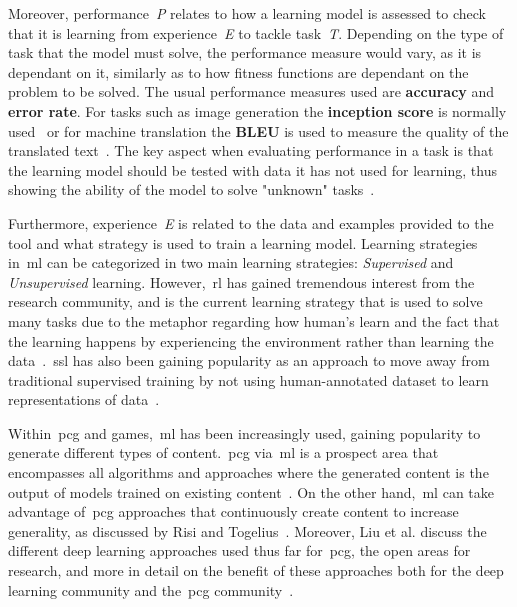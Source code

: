 Moreover, performance~\textit{P} relates to how a learning model is assessed to check that it is learning from experience~\textit{E} to tackle task~\textit{T}. Depending on the type of task that the model must solve, the performance measure would vary, as it is dependant on it, similarly as to how fitness functions are dependant on the problem to be solved. The usual performance measures used are \textbf{accuracy} and \textbf{error rate}. For tasks such as image generation the \textbf{inception score} is normally used~\cite{salimans_improved_2016} or for machine translation the \textbf{BLEU} is used to measure the quality of the translated text~\cite{papineni_bleu_2002}. The key aspect when evaluating performance in a task is that the learning model should be tested with data it has not used for learning, thus showing the ability of the model to solve "unknown" tasks~\cite{goodfellow_deep_2016}. 

Furthermore, experience~\textit{E} is related to the data and examples provided to the tool and what strategy is used to train a learning model. Learning strategies in~\acrshort{ml} can be categorized in two main learning strategies: \emph{Supervised} and \emph{Unsupervised} learning. However,~\acrfull{rl} has gained tremendous interest from the research community, and is the current learning strategy that is used to solve many tasks due to the metaphor regarding how human's learn and the fact that the learning happens by experiencing the environment rather than learning the data~\cite{juliani_obstacle_2019}.~\acrfull{ssl} has also been gaining popularity as an approach to move away from traditional supervised training by not using human-annotated dataset to learn representations of data~\cite{doersch_multi-task_2017}.

Within~\acrlong{pcg} and games,~\acrshort{ml} has been increasingly used, gaining popularity to generate different types of content.~\acrshort{pcg} via~\acrshort{ml} is a prospect area that encompasses all algorithms and approaches where the generated content is the output of models trained on existing content~\cite{summerville_procedural_2018}. On the other hand,~\acrshort{ml} can take advantage of~\acrshort{pcg} approaches that continuously create content to increase generality, as discussed by Risi and Togelius~\cite{risi_increasing_2020}. Moreover, Liu et al. discuss the different deep learning approaches used thus far for~\acrshort{pcg}, the open areas for research, and more in detail on the benefit of these approaches both for the deep learning community and the~\acrshort{pcg} community~\cite{liu_deep_2020}.

